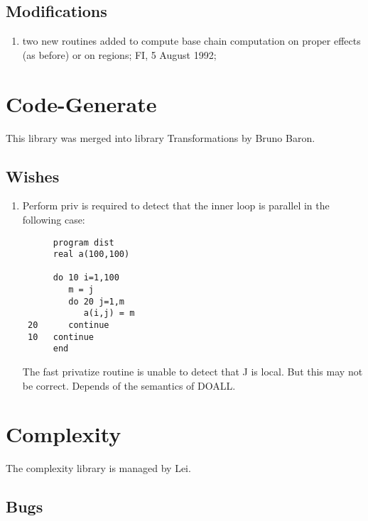 \subsection{Modifications}

\begin{enumerate}

  \item two new routines added to compute base chain computation on
        proper effects (as before) or on regions; FI, 5 August 1992;

\end{enumerate}

\section{Code-Generate}

This library was merged into library Transformations by Bruno Baron.

\subsection{Wishes}

\begin{enumerate}

  \item Perform priv is required to detect that the inner loop is
parallel in the following case:
\begin{verbatim}
      program dist
      real a(100,100)

      do 10 i=1,100
         m = j
         do 20 j=1,m
            a(i,j) = m
 20      continue
 10   continue
      end
\end{verbatim}
The fast privatize routine is unable to detect that J is local.  But
this may not be correct. Depends of the semantics of DOALL.
      
\end{enumerate}

\section{Complexity}

The complexity library is managed by Lei.

\subsection{Bugs}

